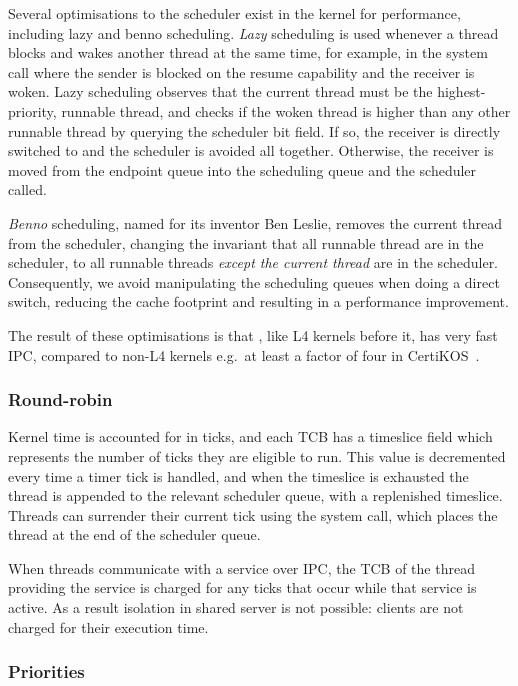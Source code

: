 Several optimisations to the scheduler exist in the kernel for performance, including lazy and benno
scheduling. 
\emph{Lazy} scheduling is used whenever a thread blocks and wakes
another thread at the same time, for example, in the  system call where the sender is
blocked on the resume capability and the receiver is woken. Lazy scheduling observes that the
current thread must be the highest-priority, runnable thread, and checks if the woken thread is
higher than any other runnable thread by querying the scheduler bit field. If so, the receiver is
directly switched to and the scheduler is avoided all together. Otherwise, the receiver is moved from
the endpoint queue into the scheduling queue and the scheduler called.

\emph{Benno} scheduling, named for its inventor Ben Leslie, removes the current thread from the 
scheduler, changing the invariant that all runnable thread are in the scheduler, to all runnable
threads \emph{except the current thread} are in the scheduler. Consequently, we avoid manipulating the
scheduling queues when doing a direct switch, reducing the cache footprint and resulting in a performance improvement.

The result of these optimisations is that \selfour, like L4 kernels before it, has very fast
\gls{IPC}, compared to non-L4 kernels e.g.\ at least a factor of four in CertiKOS~\citep{Gu_SCWKSC_16}.

\subsubsection{Round-robin}

Kernel time is accounted for in ticks, and each TCB has a timeslice field which represents the number of ticks they are eligible to run. 
This value is decremented every time a timer tick is handled, and when the timeslice is exhausted the thread is appended to the relevant scheduler queue, with a replenished timeslice.
Threads can surrender their current tick using the  system call, which places the thread
at the end of the scheduler queue.

When threads communicate with a service over \gls{IPC}, the TCB of the thread providing the service
is charged for any ticks that occur while that service is active. As a result isolation in shared
server is not possible: clients are not charged for their execution time. 

\subsubsection{Priorities}

